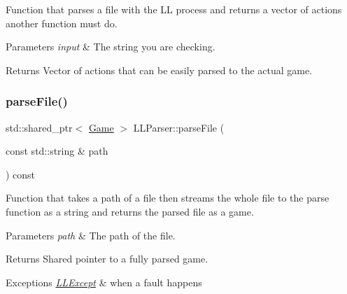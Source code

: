 Function that parses a file with the LL process and returns a vector of actions another function must do. 


\begin{DoxyParams}{Parameters}
{\em input} & The string you are checking. \\
\hline
\end{DoxyParams}
\begin{DoxyReturn}{Returns}
Vector of actions that can be easily parsed to the actual game. 
\end{DoxyReturn}
\mbox{\label{classLLParser_abfc94f8f8cc9230db87183008939dd23}} 
\subsubsection{\texorpdfstring{parse\+File()}{parseFile()}}
{\footnotesize\ttfamily std\+::shared\+\_\+ptr$<$ \hyperlink{classGame}{Game} $>$ L\+L\+Parser\+::parse\+File (\begin{DoxyParamCaption}\item[{const std\+::string \&}]{path }\end{DoxyParamCaption}) const}



Function that takes a path of a file then streams the whole file to the parse function as a string and returns the parsed file as a game. 


\begin{DoxyParams}{Parameters}
{\em path} & The path of the file. \\
\hline
\end{DoxyParams}
\begin{DoxyReturn}{Returns}
Shared pointer to a fully parsed game. 
\end{DoxyReturn}

\begin{DoxyExceptions}{Exceptions}
{\em \hyperlink{classLLExcept}{L\+L\+Except}} & when a fault happens \\
\hline
\end{DoxyExceptions}
\mbox{\label{classLLParser_ad56ae17adea4df70ced21f4299dd3429}} 
